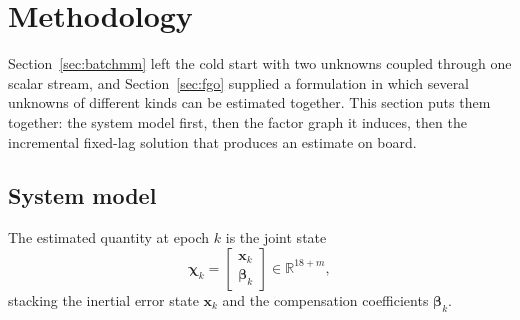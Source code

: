 
\section{Methodology}\label{sec:method}
Section~\ref{sec:batchmm} left the cold start with two unknowns coupled through
one scalar stream, and Section~\ref{sec:fgo} supplied a formulation in which
several unknowns of different kinds can be estimated together. This section puts
them together: the system model first, then the factor graph it induces, then
the incremental fixed-lag solution that produces an estimate on board.

\subsection{System model}\label{sec:sysmodel}
The estimated quantity at epoch $k$ is the joint state
\begin{equation}
\boldsymbol{\chi}_k=\begin{bmatrix}\mathbf{x}_k\\ \boldsymbol{\beta}_k\end{bmatrix}
\in\mathbb{R}^{18+m},
\label{eq:jointstate}
\end{equation}
stacking the inertial error state $\mathbf{x}_k$ and the compensation
coefficients $\boldsymbol{\beta}_k$.

